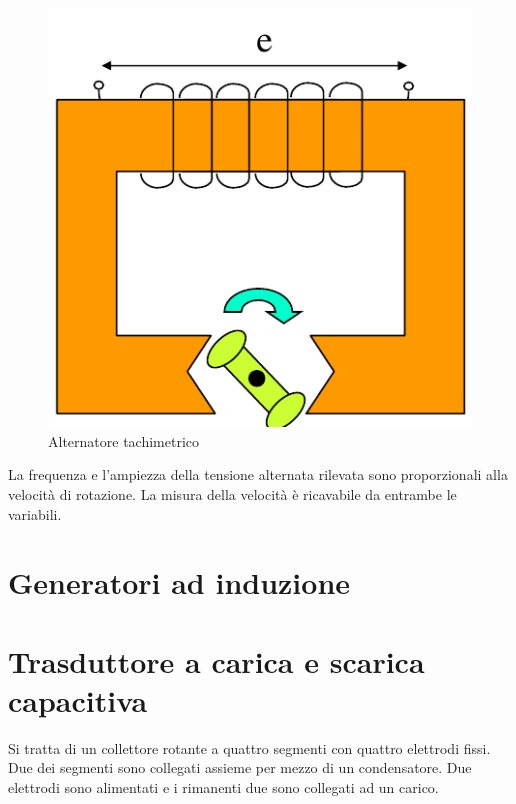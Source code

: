 \begin{figure}[htbp]
	\centering
	\includegraphics[scale=0.5]
			{img/alternatoretachi.png}
	\caption{Alternatore tachimetrico\label{fig:altachi}}
\end{figure}


La frequenza e l'ampiezza della tensione alternata rilevata sono
proporzionali alla velocità di rotazione. La misura della velocità è
ricavabile da entrambe le variabili.


\section{Generatori ad induzione}


\section{Trasduttore a carica e scarica capacitiva}
Si tratta di un collettore rotante a quattro segmenti con quattro
elettrodi fissi. Due dei segmenti sono collegati assieme per mezzo di
un condensatore. Due elettrodi sono alimentati e i rimanenti due sono
collegati ad un carico.

